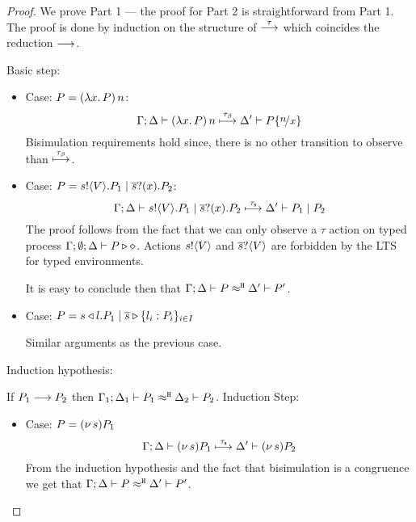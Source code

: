 

\begin{proof}
	\noi 
	We prove Part 1 --- the proof for Part 2 is straightforward from Part 1.
	The proof is done by induction on the structure of $\stackrel{\tau}{\longrightarrow}$
	which coincides the reduction $\longrightarrow$.

	\noi Basic step:
	\begin{itemize}
	\item Case: $P = (\lambda x.\,P)\, {n}$:
%
	\[
		\horel{\Gamma}{\Delta}{\appl{(\abs{x}{P})}{n}}{\hby{\btau}}{\Delta'}{P \subst{n}{x}}
	\]
%
	\noi Bisimulation requirements hold since, there is no other transition to observe than ${\stackrel{\tau_{\beta}}{\longmapsto}}$.

	\item Case: $P = s ! \langle V \rangle . P_1 \;|\; \overline{s} ? (x) . P_2$:
%
	\[
		\Gamma; \Delta \vdash s ! \langle V \rangle . P_1 \;|\; \overline{s} ? (x) . P_2 \stackrel{\tau_{\mathsf{s}}}{\longmapsto} \Delta' \vdash P_1 \;|\; P_2
	\]
%
	\noi The proof follows from the fact that we can only observe a $\tau$
	action on typed process
	$\Gamma; \emptyset; \Delta \vdash P \triangleright \diamond$.
	Actions $s ! \langle V \rangle$ and $\overline{s} ? \langle V \rangle$
	are forbidden by the LTS for typed environments.

	\noi It is easy to conclude then that $\Gamma; \Delta \vdash P \approx^\mathtt{H} \Delta' \vdash P'$.

	\item Case: $P = s \triangleleft l . P_1 \;|\; \overline{s} \triangleright \{l_i: P_i\}_{i \in I}$

	\noi Similar arguments as the previous case.
	\end{itemize}
	
	\noi Induction hypothesis:

	\noi If $P_1 \longrightarrow P_2$ then $\Gamma_1; \Delta_1 \vdash P_1 \approx^\mathtt{H} \Delta_2 \vdash P_2$.
	\noi Induction Step:
	\begin{itemize}

	\item Case: $P = (\nu\, s) P_1$
%
	\[
		\Gamma; \Delta \vdash (\nu\, s){P_1} \stackrel{\tau_{\mathsf{s}}}{\longmapsto} \Delta' \vdash (\nu\, s) P_2
	\]
%
	\noi From the induction hypothesis and the fact that bisimulation is a congruence
	we get that $\Gamma; \Delta \vdash P \approx^\mathtt{H} \Delta' \vdash P'$.


\end{itemize}
\end{proof}

